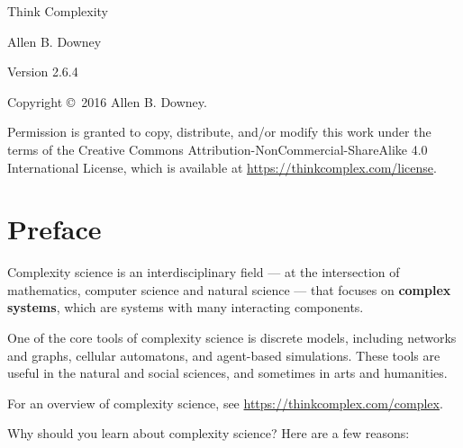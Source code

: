 \documentclass[12pt]{book}
\newcommand{\thetitle}{Think Complexity}
\newcommand{\theauthors}{Allen B. Downey}
\newcommand{\theversion}{2.6.4}
\theoremstyle{exercise}
\begin{document}
\begin{htmlonly}

\vspace{1em}

{\Large \thetitle}

{\large \theauthors}

Version \theversion

\vspace{1em}

Copyright \copyright ~2016 \theauthors.

Permission is granted to copy, distribute, and/or modify this work
under the terms of the Creative Commons
Attribution-NonCommercial-ShareAlike 4.0 International License, which is
available at \url{https://thinkcomplex.com/license}.

\vspace{1em}

\setcounter{chapter}{-1}

\end{htmlonly}

\fi

\chapter{Preface}
\label{preface}

Complexity science is an interdisciplinary
field --- at the intersection of mathematics, computer science and
natural science --- that focuses on {\bf complex systems},
which are systems with many interacting components.

One of the core tools of complexity science is discrete models,
including networks and graphs, cellular automatons, and agent-based
simulations.  These tools are useful in the natural and social sciences,
and sometimes in arts and humanities.

For an overview of complexity science, see
\url{https://thinkcomplex.com/complex}.




Why should you learn about complexity science?  Here are a few reasons:
\end{document}
